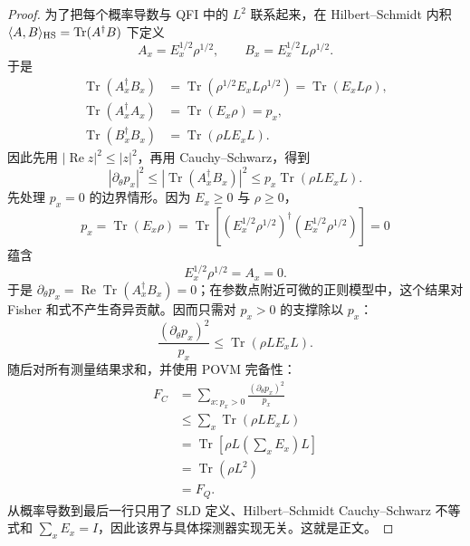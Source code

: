 \begin{proof}
为了把每个概率导数与 QFI 中的 $L^2$ 联系起来，在 Hilbert--Schmidt 内积
$\langle A,B\rangle_{\rm HS}=\operatorname{Tr}(A^\dagger B)$ 下定义
\begin{equation*}
 A_x=E_x^{1/2}\rho^{1/2},
 \qquad
 B_x=E_x^{1/2}L\rho^{1/2}.
\end{equation*}
于是
\begin{align*}
 \operatorname{Tr}(A_x^\dagger B_x)
 &=\operatorname{Tr}(\rho^{1/2}E_xL\rho^{1/2})
 =\operatorname{Tr}(E_xL\rho),\\
 \operatorname{Tr}(A_x^\dagger A_x)
 &=\operatorname{Tr}(E_x\rho)=p_x,\\
 \operatorname{Tr}(B_x^\dagger B_x)
 &=\operatorname{Tr}(\rho L E_xL).
\end{align*}
因此先用 $|\operatorname{Re}z|^2\le|z|^2$，再用 Cauchy--Schwarz，得到
\begin{equation*}
 |\partial_\theta p_x|^2
 \le |\operatorname{Tr}(A_x^\dagger B_x)|^2
 \le p_x\operatorname{Tr}(\rho L E_xL).
\end{equation*}
先处理 $p_x=0$ 的边界情形。因为 $E_x\ge0$ 与 $\rho\ge0$，
\begin{equation*}
p_x=\operatorname{Tr}(E_x\rho)
=\operatorname{Tr}\!\left[
(E_x^{1/2}\rho^{1/2})^\dagger
(E_x^{1/2}\rho^{1/2})
\right]=0
\end{equation*}
蕴含
\begin{equation*}
E_x^{1/2}\rho^{1/2}=A_x=0.
\end{equation*}
于是
$\partial_\theta p_x=\operatorname{Re}\operatorname{Tr}(A_x^\dagger B_x)=0$；在参数点附近可微的正则模型中，这个结果对 Fisher 和式不产生奇异贡献。因而只需对 $p_x>0$ 的支撑除以 $p_x$：
\begin{equation*}
\frac{(\partial_\theta p_x)^2}{p_x}
\le\operatorname{Tr}(\rho L E_xL).
\end{equation*}
随后对所有测量结果求和，并使用 POVM 完备性：
\begin{align*}
 F_C
 &=\sum_{x:p_x>0}\frac{(\partial_\theta p_x)^2}{p_x}\\
 &\le\sum_x\operatorname{Tr}(\rho L E_xL)\\
 &=\operatorname{Tr}\!\left[
\rho L\left(\sum_xE_x\right)L
\right]\\
 &=\operatorname{Tr}(\rho L^2)\\
 &=F_Q.
\end{align*}
从概率导数到最后一行只用了 SLD 定义、Hilbert--Schmidt Cauchy--Schwarz 不等式和 $\sum_xE_x=I$，因此该界与具体探测器实现无关。这就是正文。
\end{proof}


